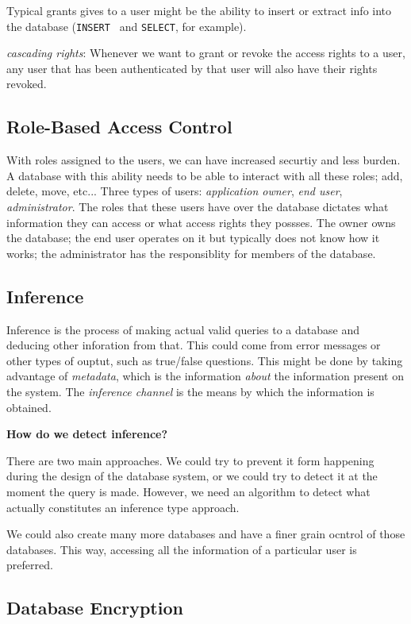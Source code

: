 \documentclass{article}
\begin{document}
 Typical grants gives to a user might be the ability to insert  or extract info into the database (\texttt{INSERT }
 and \texttt{SELECT}, for example). 

 \textit{cascading rights}: Whenever we want to grant or revoke the access rights to a user, any user that has been 
 authenticated by that user will also have their rights revoked.
 \subsection{Role-Based Access Control}
 With roles assigned to the users, we can have increased securtiy and less burden. A database with this ability needs to 
 be able to interact with all these roles;  add, delete, move, etc...
 Three types of users: \textit{application owner}, \textit{end user},\textit{ administrator}. The roles that these users
 have over the database dictates what information they can access or what access rights they possses. The owner owns the 
 database; the end user operates on it but typically does not know how it works; the administrator has the responsiblity
 for members of the database.

 \subsection{Inference}
 Inference is the process of making actual valid queries to a database and deducing other inforation from that. This could 
 come from error messages or other types of ouptut, such as true/false questions. This might be done by taking 
 advantage of \textit{metadata}, which is the information \textit{about } the information present on the system. The \textit{inference channel} is the means by which the information is  obtained.

 \hspace{10mm}\textbf{How do we detect inference?}

 There are two main approaches. We could try to prevent it form happening during the design of the database system, or we
 could try to detect it at the moment the query is made. However, we need an algorithm to detect what actually constitutes
 an inference type approach.

 We could also create many more databases and have a finer grain ocntrol of those databases. This way, accessing all the 
 information of a particular user is preferred.

 \subsection{Database Encryption}
\end{document}
